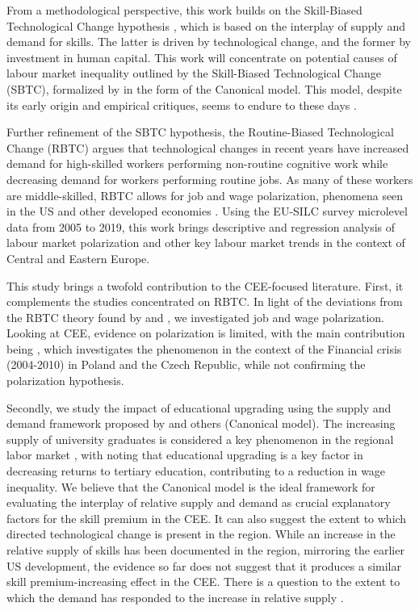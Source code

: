 \documentclass[11pt]{article}
\begin{document}
From a methodological perspective, this work builds on the Skill-Biased Technological Change hypothesis \citep{katz1992changes}, which is based on the interplay of supply and demand for skills. The latter is driven by technological change, and the former by investment in human capital. This work will concentrate on potential causes of labour market inequality outlined by the Skill-Biased Technological Change (SBTC), formalized by \cite{katz1992changes} in the form of the Canonical model. This model, despite its early origin \citep{katz1992changes} and empirical critiques, seems to endure to these days \citep{aziz2021between, goldin2020extending}.

Further refinement of the SBTC hypothesis, the Routine-Biased Technological Change (RBTC) argues that technological changes in recent years have increased demand for high-skilled workers performing non-routine cognitive work while decreasing demand for workers performing routine jobs. As many of these workers are middle-skilled, RBTC allows for job and wage polarization, phenomena seen in the US and other developed economies \citep{rodrik2020economic, temin2018vanishing}. Using the EU-SILC survey microlevel data from 2005 to 2019, this work brings descriptive and regression analysis of labour market polarization and other key labour market trends in the context of Central and Eastern Europe.


This study brings a twofold contribution to the CEE-focused literature. First, it complements the studies concentrated on RBTC. In light of the deviations from the RBTC theory found by \citet{arendt2019technical} and \citet{hardy2018educational}, we investigated job and wage polarization. Looking at CEE, evidence on polarization is limited, with the main contribution being \cite{mysikova2018personal}, which investigates the phenomenon in the context of the Financial crisis (2004-2010) in Poland and the Czech Republic, while not confirming the polarization hypothesis.

Secondly, we study the impact of educational upgrading using the supply and demand framework proposed by \cite{katz1992changes} and others (Canonical model). The increasing supply of university graduates is considered a key phenomenon in the regional labor market \citep{arendt2019technical, hardy2018educational}, with \cite{magda2021firms} noting that educational upgrading is a key factor in decreasing returns to tertiary education, contributing to a reduction in wage inequality. We believe that the Canonical model is the ideal framework for evaluating the interplay of relative supply and demand as crucial explanatory factors for the skill premium in the CEE. It can also suggest the extent to which directed technological change is present in the region. While an increase in the relative supply of skills has been documented in the region, mirroring the earlier US development, the evidence so far does not suggest that it produces a similar skill premium-increasing effect in the CEE. There is a question to the extent to which the demand has responded to the increase in relative supply \cite{acemoglu2002directed}.
\end{document}
